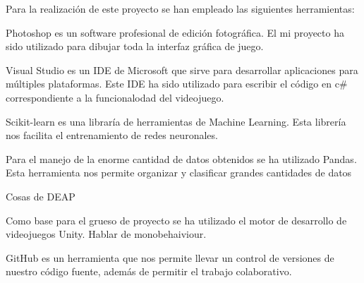 
Para la realización de este proyecto se han empleado las siguientes herramientas:

Photoshop es un software profesional de edición fotográfica. El mi proyecto ha sido utilizado para dibujar toda la interfaz gráfica de juego.

Visual Studio  es un IDE de Microsoft que sirve para desarrollar aplicaciones para múltiples plataformas. Este IDE ha sido utilizado para escribir el código en c# correspondiente a la funcionalodad del videojuego.

\cite{scikit} Scikit-learn es una libraría de herramientas de Machine Learning. Esta librería nos facilita el entrenamiento de redes neuronales.

\cite{mckinney-proc-scipy-2010} \cite{mckinney-proc-scipy-2011}Para el manejo de la enorme cantidad de datos obtenidos se ha utilizado Pandas. Esta herramienta nos permite organizar y clasificar grandes cantidades de datos 

\cite{fortin2012deap} Cosas de DEAP

Como base para el grueso de proyecto se ha utilizado el motor de desarrollo de videojuegos Unity.
Hablar de monobehaiviour.

GitHub es un herramienta que nos permite llevar un control de versiones de nuestro código fuente, además de permitir el trabajo colaborativo.


